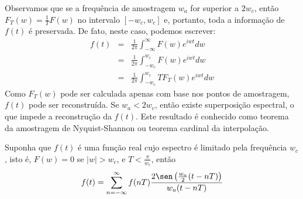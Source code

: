 \begin{obs}Observamos que se a frequência de amostragem $w_a$ for superior a $2w_c$, então $F_T(w)=\frac{1}{T}F(w)$ no intervalo $[-w_c,w_c]$ e, portanto, toda a informação de $f(t)$ é preservada. De fato, neste caso, podemos escrever:
\begin{eqnarray*}
f(t)&=&\frac{1}{2\pi}\int_{-\infty}^\infty F(w)e^{iwt}dw\\
&=&\frac{1}{2\pi}\int_{-w_c}^{w_c} F(w)e^{iwt}dw\\
&=&\frac{1}{2\pi}\int_{-w_c}^{w_c} TF_T(w)e^{iwt}dw
\end{eqnarray*}
Como $F_T(w)$ pode ser calculada apenas com base nos pontos de amostragem, $f(t)$ pode ser reconstruída. Se $w_a<2w_c$, então existe superposição espectral, o que impede a reconstrução da $f(t)$. Este resultado é conhecido como teorema da amostragem de Nyquist-Shannon ou teorema cardinal da interpolação.
\end{obs}
\begin{teo} Suponha que $f(t)$ é uma função real cujo espectro é limitado pela frequência $w_c$, isto é, $F(w)=0$ se $|w|>w_c$, e $T<\frac{\pi}{w_c}$, então
\begin{equation}
f(t)=\sum_{n=-\infty}^\infty f(nT) \frac{2\sen\left(\frac{w_a}{2}(t-nT)\right)}{w_a(t-nT)}
\end{equation}
\end{teo}
